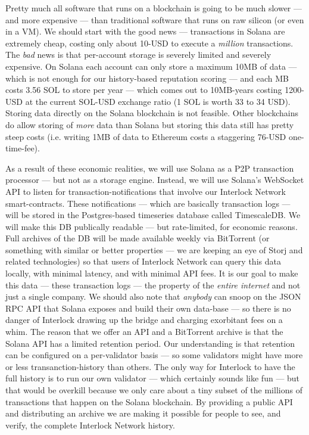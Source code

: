 \documentclass[a4paper]{article}
\begin{document}
Pretty much all software that runs on a blockchain is going to be much slower ---  and more expensive ---  than traditional software that runs on raw silicon (or even in a VM). We should start with the good news ---  transactions in Solana are extremely cheap, costing only about 10-USD to execute a \emph{million} transactions. The \emph{bad} news is that per-account storage is severely limited and severely expensive. On Solana each account can only store a maximum 10MB of data ---  which is not enough for our history-based reputation scoring ---  and each MB costs 3.56 SOL to store per year ---  which comes out to 10MB-years costing 1200-USD at the current SOL-USD exchange ratio (1 SOL is worth 33 to 34 USD). Storing data directly on the Solana blockchain is not feasible. Other blockchains do allow storing of \emph{more} data than Solana but storing this data still has pretty steep costs (i.e. writing 1MB of data to Ethereum costs a staggering 76-USD one-time-fee).

As a result of these economic realities, we will use Solana as a P2P transaction processor ---  but not as a storage engine. Instead, we will use Solana's WebSocket API to listen for transaction-notifications that involve our Interlock Network smart-contracts. These notifications ---  which are basically transaction logs ---  will be stored in the Postgres-based timeseries database called TimescaleDB. We will make this DB publically readable ---  but rate-limited, for economic reasons. Full archives of the DB will be made available weekly via BitTorrent (or something with similar or better properties ---  we are keeping an eye of Storj and related technologies) so that users of Interlock Network can query this data locally, with minimal latency, and with minimal API fees. It is our goal to make this data ---  these transaction logs ---  the property of the \emph{entire internet} and not just a single company. We should also note that \emph{anybody} can snoop on the JSON RPC API that Solana exposes and build their own data-base ---  so there is no danger of Interlock drawing up the bridge and charging exorbitant fees on a whim. The reason that we offer an API and a BitTorrent archive is that the Solana API has a limited retention period. Our understanding is that retention can be configured on a per-validator basis ---  so some validators might have more or less transanction-history than others. The only way for Interlock to have the full history is to run our own validator ---  which certainly sounds like fun ---  but that would be overkill because we only care about a tiny subset of the millions of transactions that happen on the Solana blockchain. By providing a public API and distributing an archive we are making it possible for people to see, and verify, the complete Interlock Network history.
\end{document}
